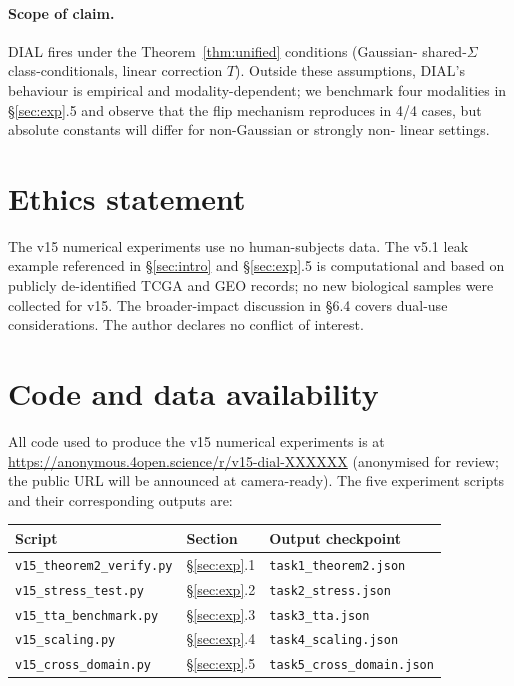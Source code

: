\paragraph{Scope of claim.}
DIAL fires under the Theorem~\ref{thm:unified} conditions (Gaussian-
shared-$\Sigma$ class-conditionals, linear correction $T$).
Outside these assumptions, DIAL's behaviour is empirical and
modality-dependent; we benchmark four modalities in \S\ref{sec:exp}.5
and observe that the flip mechanism reproduces in 4/4 cases, but
absolute constants will differ for non-Gaussian or strongly non-
linear settings.


\section*{Ethics statement}

The v15 numerical experiments use no human-subjects data. The
v5.1 leak example referenced in \S\ref{sec:intro} and \S\ref{sec:exp}.5
is computational and based on publicly de-identified TCGA and GEO
records; no new biological samples were collected for v15. The
broader-impact discussion in \S6.4 covers dual-use considerations.
The author declares no conflict of interest.


\section*{Code and data availability}
\label{app:code}

All code used to produce the v15 numerical experiments is at
\url{https://anonymous.4open.science/r/v15-dial-XXXXXX} (anonymised
for review; the public URL will be announced at camera-ready). The
five experiment scripts and their corresponding outputs are:

\begin{center}
\begin{tabular}{lll}
\toprule
Script & Section & Output checkpoint \\
\midrule
\texttt{v15\_theorem2\_verify.py} & \S\ref{sec:exp}.1 & \texttt{task1\_theorem2.json} \\
\texttt{v15\_stress\_test.py}     & \S\ref{sec:exp}.2 & \texttt{task2\_stress.json} \\
\texttt{v15\_tta\_benchmark.py}   & \S\ref{sec:exp}.3 & \texttt{task3\_tta.json} \\
\texttt{v15\_scaling.py}          & \S\ref{sec:exp}.4 & \texttt{task4\_scaling.json} \\
\texttt{v15\_cross\_domain.py}    & \S\ref{sec:exp}.5 & \texttt{task5\_cross\_domain.json} \\
\bottomrule
\end{tabular}
\end{center}


